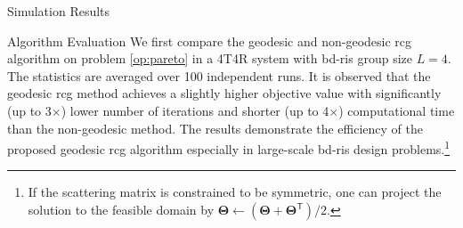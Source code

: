 \documentclass[journal]{IEEEtran}
\begin{document}
\begin{section}{Simulation Results}
	\begin{subsection}{Algorithm Evaluation}
		We first compare the geodesic and non-geodesic \gls{rcg} algorithm on problem \eqref{op:pareto} in a 4T4R system with \gls{bd}-\gls{ris} group size $L=4$.
		The statistics are averaged over \num{100} independent runs.
		It is observed that the geodesic \gls{rcg} method achieves a slightly higher objective value with significantly (up to 3$\times$) lower number of iterations and shorter (up to 4$\times$) computational time than the non-geodesic method.
		The results demonstrate the efficiency of the proposed geodesic \gls{rcg} algorithm especially in large-scale \gls{bd}-\gls{ris} design problems.\footnote{If the scattering matrix is constrained to be symmetric, one can project the solution to the feasible domain by $\mathbf{\Theta} \gets (\mathbf{\Theta} + \mathbf{\Theta}^\mathsf{T})/2$.}
	\end{subsection}


\end{section}
\end{document}
